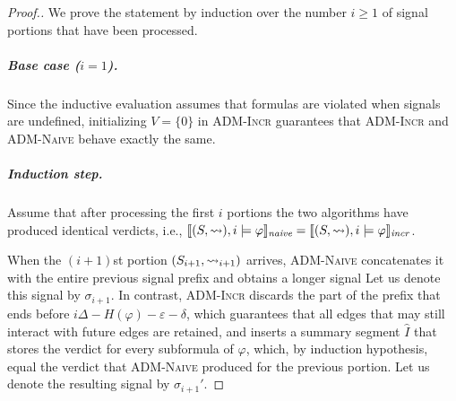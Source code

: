 \begin{proof}[\normalsize Proof.]
	\normalsize
%	
%	
%	

	We prove the statement by induction over the number $i \geq 1$ of signal portions that have been processed.
	
	\subparagraph*{Base case ($i = 1$).}
	Since the inductive evaluation assumes that formulas are violated when signals are undefined, initializing $V = \{0\}$ in \textsc{ADM-Incr} guarantees that \textsc{ADM-Incr} and \textsc{ADM-Naive} behave exactly the same.
	
	
	\subparagraph*{Induction step.}
	Assume that after processing the first $i$ portions the two algorithms have
	produced identical verdicts, i.e., $ \llbracket (S,\rightsquigarrow), i \models \varphi \rrbracket_{\textit{naive}} = \llbracket (S,\rightsquigarrow), i \models \varphi \rrbracket_{\textit{incr}}$.
	
	When the $(i+1)$st portion $(S_{i+1},\rightsquigarrow_{i+1})$ arrives, \textsc{ADM-Naive} concatenates it with the entire previous signal prefix and obtains a longer signal
	Let us denote this signal by $\sigma_{i+1}$.
	In contrast, \textsc{ADM-Incr} discards the part of the prefix that ends before $i\Delta - H(\varphi) - \varepsilon - \delta$, which guarantees that all edges that may still interact with future edges are retained, and inserts a summary segment
	$\hat{I}$ that stores the verdict for every subformula of $\varphi$, which, by induction hypothesis, equal the verdict that \textsc{ADM-Naive} produced for the previous portion.
	Let us denote the resulting signal by $\sigma_{i+1}'$.
	

\end{proof}
